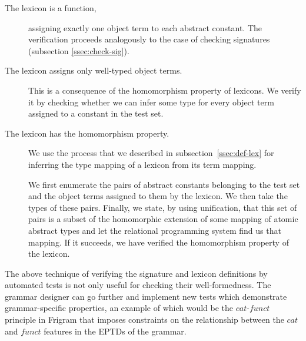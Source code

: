 \begin{description}
\item[The lexicon is a function,] assigning exactly one object term to
  each abstract constant. The verification proceeds analogously to the
  case of checking signatures (subsection \ref{ssec:check-sig}).

\item[The lexicon assigns only well-typed object terms.] This is a
  consequence of the homomorphism property of lexicons. We verify it by
  checking whether we can infer some type for every object term assigned
  to a constant in the test set.

\item[The lexicon has the homomorphism property.] We use the process
  that we described in subsection~\ref{ssec:def-lex} for inferring the
  type mapping of a lexicon from its term mapping.

  We first enumerate the pairs of abstract constants belonging to the
  test set and the object terms assigned to them by the lexicon. We then
  take the types of these pairs. Finally, we state, by using
  unification, that this set of pairs is a subset of the homomorphic
  extension of some mapping of atomic abstract types and let the
  relational programming system find us that mapping. If it succeeds, we
  have verified the homomorphism property of the lexicon.
\end{description}

The above technique of verifying the signature and lexicon definitions
by automated tests is not only useful for checking their
well-formedness. The grammar designer can go further and implement new
tests which demonstrate grammar-specific properties, an example of which
would be the $cat$-$funct$ principle in Frigram that imposes constraints
on the relationship between the $cat$ and $funct$ features in the EPTDs
of the grammar.
